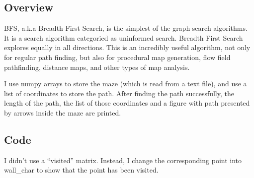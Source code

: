 \documentclass[a4paper, 11pt]{article}
\begin{document}
\subsection{Overview}

BFS, a.k.a Breadth-First Search, is the simplest of the graph search algorithms. It is a search algorithm categoried as uninformed search. Breadth First Search explores equally in all directions. This is an incredibly useful algorithm, not only for regular path finding, but also for procedural map generation, flow field pathfinding, distance maps, and other types of map analysis.\cite{redblobgames}

I use numpy arrays to store the maze (which is read from a text file), and use a list of coordinates to store the path. After finding the path successfully, the length of the path, the list of those coordinates and a figure with path presented by arrows inside the maze are printed.

\subsection{Code}
I didn't use a ``visited'' matrix. Instead, I change the corresponding point into wall\_char to show that the point has been visited.
\end{document}
